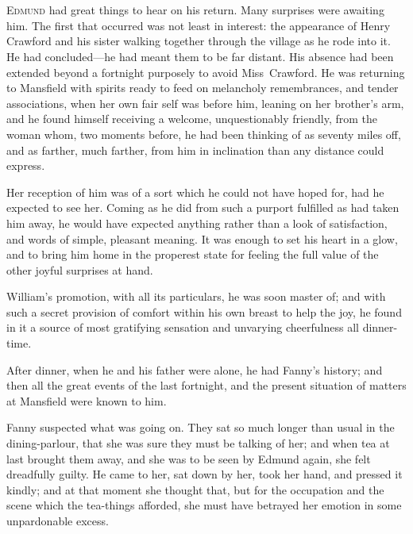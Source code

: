 \chapter[Chapter \thechapter]{} 

 \lettrine[lraise=0.3]{E}{dmund} had great things to hear on his return. Many surprises were awaiting him. The first that occurred was not least in interest: the appearance of Henry Crawford and his sister walking together through the village as he rode into it. He had concluded—he had meant them to be far distant. His absence had been extended beyond a fortnight purposely to avoid Miss~Crawford. He was returning to Mansfield with spirits ready to feed on melancholy remembrances, and tender associations, when her own fair self was before him, leaning on her brother's arm, and he found himself receiving a welcome, unquestionably friendly, from the woman whom, two moments before, he had been thinking of as seventy miles off, and as farther, much farther, from him in inclination than any distance could express.

Her reception of him was of a sort which he could not have hoped for, had he expected to see her. Coming as he did from such a purport fulfilled as had taken him away, he would have expected anything rather than a look of satisfaction, and words of simple, pleasant meaning. It was enough to set his heart in a glow, and to bring him home in the properest state for feeling the full value of the other joyful surprises at hand.

William's promotion, with all its particulars, he was soon master of; and with such a secret provision of comfort within his own breast to help the joy, he found in it a source of most gratifying sensation and unvarying cheerfulness all dinner-time.

After dinner, when he and his father were alone, he had Fanny's history; and then all the great events of the last fortnight, and the present situation of matters at Mansfield were known to him.

Fanny suspected what was going on. They sat so much longer than usual in the dining-parlour, that she was sure they must be talking of her; and when tea at last brought them away, and she was to be seen by Edmund again, she felt dreadfully guilty. He came to her, sat down by her, took her hand, and pressed it kindly; and at that moment she thought that, but for the occupation and the scene which the tea-things afforded, she must have betrayed her emotion in some unpardonable excess.

